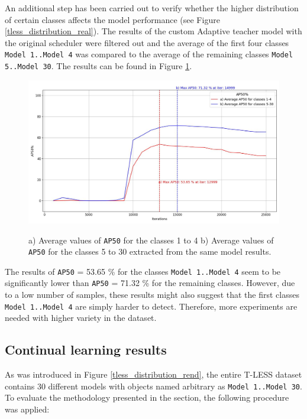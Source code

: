 An additional step has been carried out to verify whether the higher distribution of certain classes affects the model performance (see Figure \ref{tless_distribution_real}). The results of the custom Adaptive teacher model with the original scheduler were filtered out and the average of the first four classes \texttt{Model 1..Model 4} was  compared to the average of the remaining classes \texttt{Model 5..Model 30}. The results can be found in Figure \ref{myModel_withOrigSched_grouped}. 
    
\begin{figure}[htb]
	\begin{center}
	\includegraphics[width=14cm]{./AP50_per_class_group.jpg}
	\end{center}
	\caption{a) Average values of \texttt{AP50} for the classes 1 to 4 b) Average values of \texttt{AP50} for the classes 5 to 30 extracted from the same model results. }
	\begin{center}
	\label{myModel_withOrigSched_grouped}
	\end{center}
\end{figure}

The results of \texttt{AP50} = 53.65 \% for the classes \texttt{Model 1..Model 4} seem to be significantly lower than \texttt{AP50} = 71.32 \% for the remaining classes. However, due to a low number of samples, these results might also suggest that the first classes \texttt{Model 1..Model 4} are simply harder to detect. Therefore, more experiments are needed with higher variety in the dataset.  
\subsection{Continual learning results}
\label{cont_learning_results} 
\FloatBarrier 
As was introduced in Figure \ref{tless_distribution_rend}, the entire T-LESS dataset contains 30 different models with objects named arbitrary as \texttt{Model 1..Model 30}. To evaluate the methodology presented in the  section, the following procedure was applied:
 
